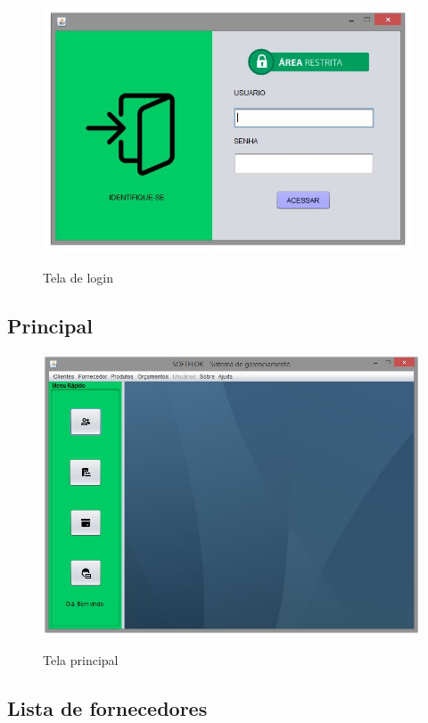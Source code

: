 \begin{figure}[H]
\centering
\caption{Tela de login}
\includegraphics[width=11cm]{imagens/telas/Login}
\label{fig:Tela de Login}
\end{figure}
      
      
\subsection{Principal}
\begin{figure}[H]
\centering
\caption{Tela principal}
\includegraphics[width=12cm]{imagens/telas/Principal}
\label{fig:Tela principal}
\end{figure}
       
       
\subsection{Lista de fornecedores}
    
